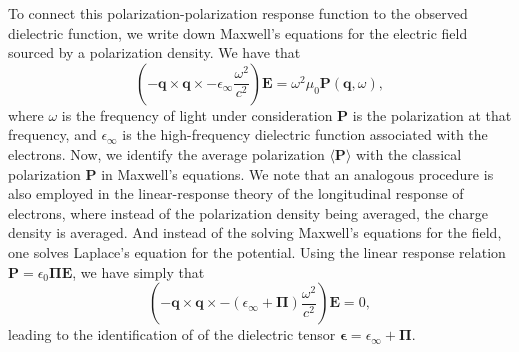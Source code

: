\documentclass[superscriptaddress,reprint,prb]{revtex4-1}
\begin{document}
To connect this polarization-polarization response function to the observed dielectric function, we write down Maxwell's equations for the electric field sourced by a polarization density. We have that
\begin{equation}
\left(-\mathbf{q}\times\mathbf{q}\times - \epsilon_{\infty}\frac{\omega^2}{c^2} \right)\mathbf{E} = \omega^2\mu_0\mathbf{P}(\mathbf{q},\omega),
\end{equation}
where $\omega$ is the frequency of light under consideration $\mathbf{P}$ is the polarization at that frequency, and $\epsilon_{\infty}$ is the high-frequency dielectric function associated with the electrons. Now, we identify the average polarization $\langle\mathbf{P}\rangle$ with the classical polarization $\mathbf{P}$ in Maxwell's equations. We note that an analogous procedure is also employed in the linear-response theory of the longitudinal response of electrons, where instead of the polarization density being averaged, the charge density is averaged. And instead of the solving Maxwell's equations for the field, one solves Laplace's equation for the potential.  Using the linear response relation $\mathbf{P} = \epsilon_0\boldsymbol{\Pi}\mathbf{E}$, we have simply that
\begin{equation}
\left(-\mathbf{q}\times\mathbf{q}\times - \left(\epsilon_{\infty} + \boldsymbol{\Pi} \right)\frac{\omega^2}{c^2}\right)\mathbf{E} = 0,
\end{equation}
leading to the identification of of the dielectric tensor $\boldsymbol{\epsilon} = \epsilon_{\infty} + \boldsymbol{\Pi}$. 
\end{document}
